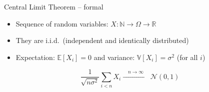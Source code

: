 \documentclass[usepdftitle=false]{beamer}
\newcommand{\Nat}{\mathbb{N}}
\newcommand{\Real}{\mathbb{R}}
\begin{document}
\begin{frame}{Central Limit Theorem -- formal} %

\begin{itemize}

\item Sequence of random variables: $X : \Nat \to \Omega \to \Real$

\item They are i.i.d.\ (independent and identically distributed)

\item Expectation: $\mathbb{E}[X_i] = 0$ and variance: $\mathbb{V}[X_i] = \sigma^2$ (for all $i$)

\end{itemize}

\[ \frac{1}{\sqrt{n \sigma^2}} \sum_{i < n} X_i \xrightarrow{\quad n \to \infty \quad} \mathcal{N}(0, 1) \]

\end{frame} %
\end{document}
